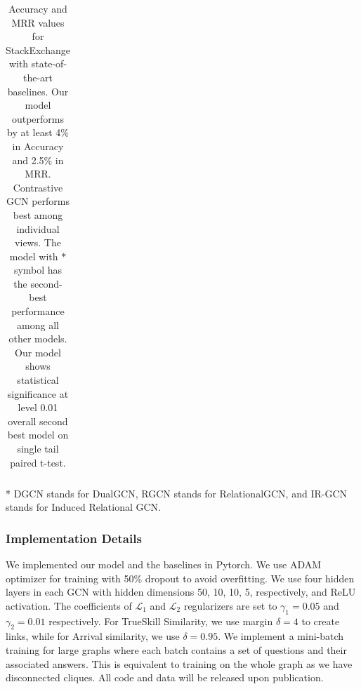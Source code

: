 \begin{table}[h]
\begin{threeparttable}
\begin{tabular}{l|c c|c c|c c|c c|c c}
     \bottomrule
   \end{tabular}
   \begin{tablenotes}
       \footnotesize
       \item[*] DGCN stands for DualGCN, RGCN stands for RelationalGCN, and IR-GCN stands for Induced Relational GCN.
   \end{tablenotes}
   \caption{\small \label{tab:stackacc} Accuracy and MRR values for StackExchange with state-of-the-art baselines. Our model outperforms by at least 4\% in Accuracy and 2.5\% in MRR. Contrastive GCN performs best among individual views. The model with $*$ symbol has the second-best performance among all other models. Our model shows statistical significance at level 0.01 overall second best model on single tail paired t-test.}
   \end{threeparttable}
 \vspace{-0.2in}
 \end{table}

\subsubsection{Implementation Details}
We implemented our model and the baselines in Pytorch. We use ADAM optimizer \cite{ADAM} for training with 50\% dropout to avoid overfitting. We use four hidden layers in each GCN with hidden dimensions 50, 10, 10, 5, respectively, and ReLU activation. The coefficients of $\mathcal{L}_1$ and $\mathcal{L}_2$ regularizers are set to $\gamma_1 = 0.05$ and $\gamma_2 = 0.01$ respectively. For TrueSkill Similarity, we use margin $\delta = 4$ to create links, while for Arrival similarity, we use $\delta = 0.95$.
We implement a mini-batch training for large graphs where each batch contains a set of questions and their associated answers. This is equivalent to training on the whole graph as we have disconnected cliques. All code and data will be released upon publication.


